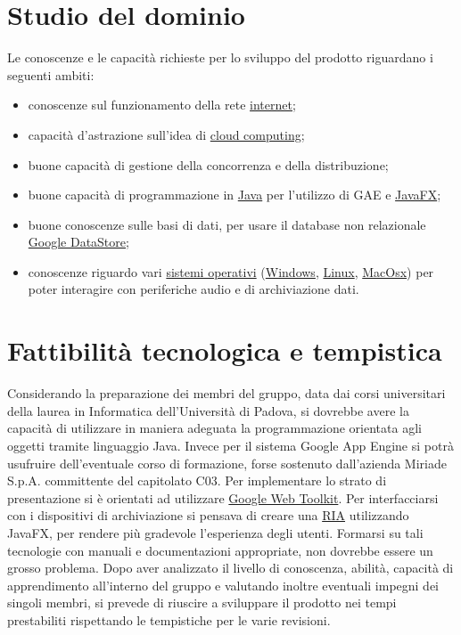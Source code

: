 \section{Studio del dominio} 
Le conoscenze e le capacit\`a richieste per lo sviluppo del prodotto
riguardano i seguenti ambiti:
\begin{itemize}
  \item conoscenze sul funzionamento della rete \underline{internet};
  \item capacit\`a d'astrazione sull'idea di \underline{cloud computing};
  \item buone capacit\`a di gestione della concorrenza e della distribuzione;
  \item buone capacit\`a di programmazione in \underline{Java} per l'utilizzo di
  GAE e \underline{JavaFX};
  \item buone conoscenze sulle basi di dati, per usare il database
  non relazionale \underline{Google DataStore};
  \item conoscenze riguardo vari \underline{sistemi operativi}
  (\underline{Windows}, \underline{Linux}, \underline{MacOsx}) per poter interagire con periferiche
  audio e di archiviazione dati.
\end{itemize}

\section{Fattibilit\`a tecnologica e tempistica}
Considerando la preparazione dei membri del gruppo, data dai corsi universitari
della laurea in Informatica dell'Universit\`a di Padova, si dovrebbe avere la
capacit\`a di utilizzare in maniera adeguata la programmazione orientata agli
oggetti tramite linguaggio Java. Invece per il sistema Google App Engine si
potr\`a usufruire dell'eventuale corso di formazione, forse sostenuto
dall'azienda Miriade S.p.A. committente del capitolato C03.
Per implementare lo strato di presentazione si \`e orientati ad utilizzare
\underline{Google Web Toolkit}. Per interfacciarsi con i dispositivi di
archiviazione si pensava di creare una \underline{RIA} utilizzando JavaFX, per
rendere pi\`u gradevole l'esperienza degli utenti. Formarsi su tali tecnologie con manuali e
documentazioni appropriate, non dovrebbe essere un grosso problema. Dopo aver
analizzato il livello di conoscenza, abilit\`a, capacit\`a di apprendimento
all'interno del gruppo e valutando inoltre eventuali impegni dei singoli membri,
si prevede di riuscire a sviluppare il prodotto nei tempi prestabiliti
rispettando le tempistiche per le varie revisioni.

